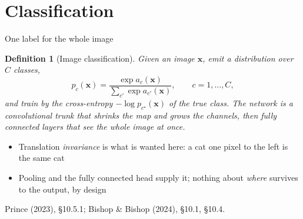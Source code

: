 \documentclass[aspectratio=169, 11pt]{beamer}
\newtheorem{defx}[theorem]{Definition}
\newcommand{\srcline}[1]{%
  \par\vspace{0.25em}%
  {\scriptsize\color{mcMuted}\hfill #1\par}}
\newcommand{\src}[3]{}      %
\begin{document}
\section{Classification}

\begin{frame}{One label for the whole image}
  \src{prince2023}{section}{10.5.1}
  \src{bishop2024}{section}{10.1}
  \src{bishop2024}{section}{10.4}
  \vspace{-0.4em}
  \begin{defx}[Image classification]\label{th:cls}
    \small
    Given an image $\mathbf{x}$, emit a distribution over $C$ classes,
    \[
      p_c(\mathbf{x}) = \frac{\exp a_c(\mathbf{x})}{\sum_{c'} \exp a_{c'}(\mathbf{x})},
      \qquad c = 1, \dots, C,
    \]
    and train by the cross-entropy $-\log p_{c^\star}(\mathbf{x})$ of the
    true class. The network is a convolutional \alert{trunk} that
    shrinks the map and grows the channels, then fully connected layers
    that see the whole image at once.
  \end{defx}
  \vspace{0.05em}
  {\footnotesize
  \begin{itemize}\itemsep0.18em
    \item Translation \emph{invariance} is what is wanted here: a cat
          one pixel to the left is the same cat
    \item Pooling and the fully connected head supply it; nothing about
          \emph{where} survives to the output, by design
  \end{itemize}}
  \vspace{-0.35em}
  \srcline{Prince (2023), \S10.5.1; Bishop \& Bishop (2024), \S10.1, \S10.4.}
\end{frame}
\end{document}
